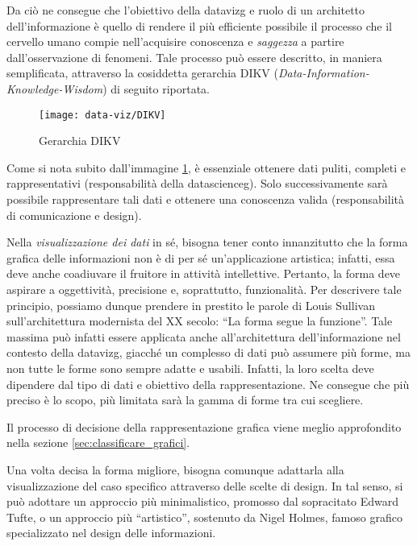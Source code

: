 Da ciò ne consegue che l'obiettivo della \gls{datavizg} e ruolo di un architetto dell'informazione è quello di rendere il più efficiente possibile il processo che il cervello
umano compie nell'acquisire conoscenza e \emph{saggezza} a partire dall'osservazione di fenomeni.
Tale processo può essere descritto, in maniera semplificata, attraverso la cosiddetta gerarchia DIKV (\emph{Data-Information-Knowledge-Wisdom}) di seguito riportata.
\begin{figure}[H] 
    \centering 
    \texttt{[image: data-viz/DIKV]} 
    \caption{Gerarchia DIKV}
    \label{fig:DIKV}
\end{figure}

Come si nota subito dall'immagine \ref{fig:DIKV}, è essenziale ottenere dati puliti, completi e rappresentativi (responsabilità della \gls{datascienceg}). Solo successivamente sarà possibile rappresentare tali dati e 
ottenere una conoscenza valida (responsabilità di comunicazione e design).

\bigskip
\noindent Nella \emph{visualizzazione dei dati} in sé, bisogna tener conto innanzitutto che la forma grafica delle informazioni non è di per sé un'applicazione artistica; infatti, 
essa deve anche coadiuvare il fruitore in attività intellettive. Pertanto, la forma deve aspirare a oggettività, precisione e, soprattutto, funzionalità.
Per descrivere tale principio, possiamo dunque prendere in prestito le parole di Louis Sullivan sull'architettura modernista del XX secolo: ``La forma segue la funzione''. 
Tale massima può infatti essere applicata anche all'architettura dell'informazione nel contesto della \gls{datavizg}, giacché
un complesso di dati può assumere più forme, ma non tutte le forme sono sempre adatte e usabili. Infatti, la loro scelta deve dipendere dal
tipo di dati e obiettivo della rappresentazione. Ne consegue che più preciso è lo scopo, più limitata sarà la gamma di forme tra cui scegliere.

Il processo di decisione della rappresentazione grafica viene meglio approfondito nella sezione \ref{sec:classificare_grafici}.

\bigskip
\noindent Una volta decisa la forma migliore, bisogna comunque adattarla alla visualizzazione del caso specifico attraverso delle scelte di design.
In tal senso, si può adottare un approccio più minimalistico, promosso dal sopracitato Edward Tufte, o un approccio più ``artistico'', 
sostenuto da Nigel Holmes, famoso grafico specializzato nel design delle informazioni.

